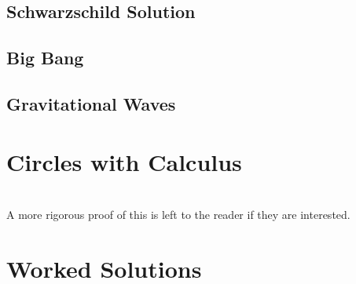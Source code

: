 \documentclass{memoir}
\begin{document}
\section{Schwarzschild Solution}
\section{Big Bang}
\section{Gravitational Waves}





\begin{appendices}
\chapter{Circles with Calculus}
 \\
A more rigorous proof of this is left to the reader if they are interested.
\chapter{Worked Solutions}

\end{appendices}
\end{document}
